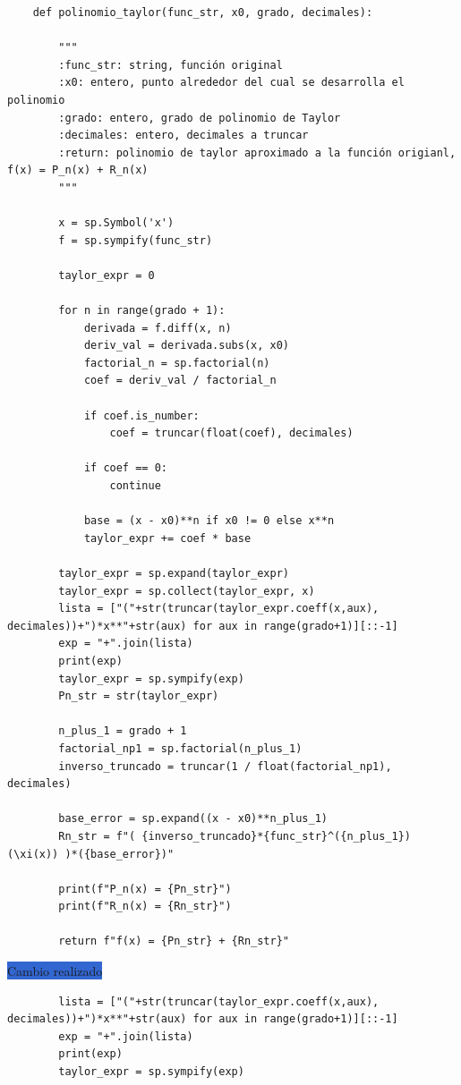 \documentclass[12pt]{article}
\begin{document}
\scriptsize
\begin{verbatim}
    def polinomio_taylor(func_str, x0, grado, decimales):
        
        """
        :func_str: string, función original
        :x0: entero, punto alrededor del cual se desarrolla el polinomio    
        :grado: entero, grado de polinomio de Taylor    
        :decimales: entero, decimales a truncar
        :return: polinomio de taylor aproximado a la función origianl, f(x) = P_n(x) + R_n(x)
        """
        
        x = sp.Symbol('x')
        f = sp.sympify(func_str)

        taylor_expr = 0

        for n in range(grado + 1):
            derivada = f.diff(x, n)
            deriv_val = derivada.subs(x, x0)
            factorial_n = sp.factorial(n)
            coef = deriv_val / factorial_n

            if coef.is_number:
                coef = truncar(float(coef), decimales)

            if coef == 0:
                continue

            base = (x - x0)**n if x0 != 0 else x**n
            taylor_expr += coef * base

        taylor_expr = sp.expand(taylor_expr)
        taylor_expr = sp.collect(taylor_expr, x)
        lista = ["("+str(truncar(taylor_expr.coeff(x,aux), decimales))+")*x**"+str(aux) for aux in range(grado+1)][::-1]
        exp = "+".join(lista)
        print(exp)
        taylor_expr = sp.sympify(exp)
        Pn_str = str(taylor_expr)

        n_plus_1 = grado + 1
        factorial_np1 = sp.factorial(n_plus_1)
        inverso_truncado = truncar(1 / float(factorial_np1), decimales)

        base_error = sp.expand((x - x0)**n_plus_1)
        Rn_str = f"( {inverso_truncado}*{func_str}^({n_plus_1})(\xi(x)) )*({base_error})"

        print(f"P_n(x) = {Pn_str}")
        print(f"R_n(x) = {Rn_str}")

        return f"f(x) = {Pn_str} + {Rn_str}"
\end{verbatim}

\colorbox{highlight}{Cambio realizado}
\begin{verbatim}
        lista = ["("+str(truncar(taylor_expr.coeff(x,aux), decimales))+")*x**"+str(aux) for aux in range(grado+1)][::-1]
        exp = "+".join(lista)
        print(exp)
        taylor_expr = sp.sympify(exp)
\end{verbatim}
\normalsize
\end{document}
